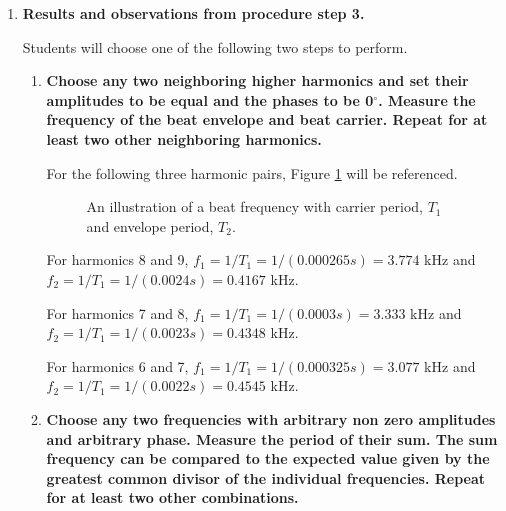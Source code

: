 \begin{enumerate}[resume]
\item {\bf Results and observations from procedure step 3.}\newline

Students will choose one of the following two steps to perform.\newline
\begin{enumerate}[label=(\Alph*)]
\item {\bf Choose any two neighboring higher harmonics and set their amplitudes to be equal and the phases to be 0$^{\circ}$. Measure the frequency of the beat envelope and beat carrier. Repeat for at least two other neighboring harmonics.}\newline

For the following three harmonic pairs, Figure \ref{fig:fscg3} will be referenced.

\begin{figure}
\caption{An illustration of a beat frequency with carrier period, $T_1$ and envelope period, $T_2$.}
\label{fig:fscg3}
\end{figure}

For harmonics 8 and 9, $f_1=1/T_1=1/(0.000265s)=3.774$ kHz and $f_2=1/T_1=1/(0.0024s)=0.4167$ kHz.\vspace{5mm}

For harmonics 7 and 8, $f_1=1/T_1=1/(0.0003s)=3.333$ kHz and $f_2=1/T_1=1/(0.0023s)=0.4348$ kHz.\vspace{5mm}

For harmonics 6 and 7, $f_1=1/T_1=1/(0.000325s)=3.077$ kHz and $f_2=1/T_1=1/(0.0022s)=0.4545$ kHz.\vspace{5mm}

\item {\bf Choose any two frequencies with arbitrary non zero amplitudes and arbitrary phase. Measure the period of their sum. The sum frequency can be compared to the expected value given by the greatest common divisor of the individual frequencies. Repeat for at least two other combinations.}\newline


\end{enumerate}
\end{enumerate}
